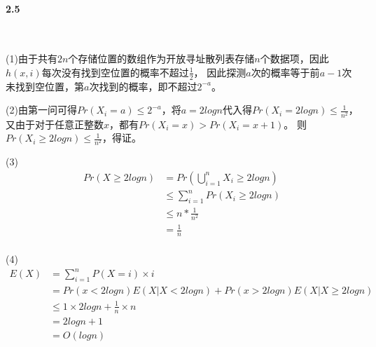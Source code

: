 \paragraph{2.5}~{}

(1)由于共有$2n$个存储位置的数组作为开放寻址散列表存储$n$个数据项，因此$h(x,i)$每次没有找到空位置的概率不超过$\frac{1}{2}$，
因此探测$a$次的概率等于前$a-1$次未找到空位置，第$a$次找到的概率，即不超过$2^{-a}$。

(2)由第一问可得$Pr(X_i=a) \le 2^{-a}$，将$a=2logn$代入得$Pr(X_i=2logn) \le \frac{1}{n^2}$，又由于对于任意正整数$x$，都有$Pr(X_i=x)>Pr(X_i=x+1)$。
则$Pr(X_i \ge 2logn) \le \frac{1}{n^2}$，得证。

(3)
$$
\begin{aligned}
    Pr(X \ge 2logn) &= Pr(\bigcup_{i=1}^{n} X_i \ge 2logn)\\
    &\le \sum_{i=1}^{n} Pr(X_i \ge 2logn)\\
    &\le n*\frac{1}{n^2}\\
    &= \frac{1}{n}\\
\end{aligned}
$$

(4)
$$
\begin{aligned}
    E(X) &= \sum_{i=1}^{n}P(X=i)\times i \\
    &= Pr(x<2logn)E(X|X<2logn) + Pr(x>2logn)E(X|X\ge 2logn) \\
    &\le 1 \times 2logn + \frac{1}{n} \times n\\ 
    &= 2logn + 1\\
    &= O(logn)
\end{aligned}
$$
